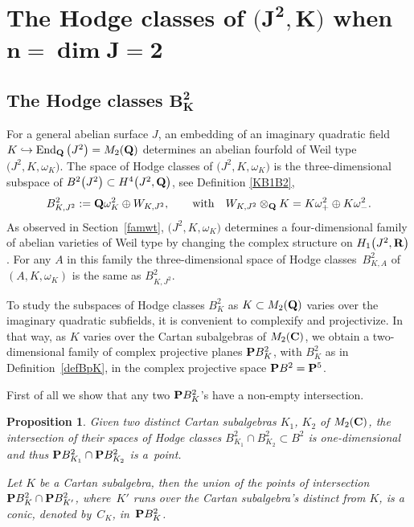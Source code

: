 \documentclass[10pt,a4paper]{amsart}
\numberwithin{equation}{section}
\newtheorem{Proposition}[Theorem]{Proposition}
 { \theoremstyle{definition}
\newtheorem{Definition}[Theorem]{Definition}
\newtheorem{Note}[Theorem]{Note}
\newtheorem{Example}[Theorem]{Example}
\newtheorem{Remark}[Theorem]{Remark} }
\begin{document}
\section[The Hodge classes of (J\^{}2,K) when n=dim J=2]{The Hodge classes of $\boldsymbol{\big(J^2,K\big)}$ when $\boldsymbol{n=\dim J=2}$}\label{limHC}

\subsection[The Hodge classes B\_K\^{}2]{The Hodge classes $\boldsymbol{B_K^2}$}\label{cubic4}

For a general abelian surface $J$,
an embedding of an imaginary quadratic field $K\hookrightarrow \operatorname{End}_{\bf Q}\big(J^2\big)=M_2({\bf Q})$
determines an abelian fourfold of Weil type $\big(J^2,K,\omega_K\big)$.
The space of Hodge classes of $\big(J^2,K,\omega_K\big)$ is the three-dimensional
subspace of $B^2\big(J^2\big)\subset H^4\big(J^2,{\bf Q}\big)$, see Definition \ref{KB1B2},
\[
B^2_{K,J^2} := {\bf Q} \omega_K^2 \oplus W_{K,J^2},\qquad \text{with}\quad
W_{K,J^2}\otimes_{\bf Q} K = K\omega_+^2 \oplus K\omega_-^2.
\]
As observed in Section~\ref{famwt},
$\big(J^2,K,\omega_K\big)$ determines
a four-dimensional family of abelian varieties of Weil type by changing the complex structure
on $H_1\big(J^2,{\bf R}\big)$.
For any $A$ in this family the three-dimensional space of Hodge classes~$B^2_{K,A}$
of $(A,K,\omega_K)$ is the same as $B^2_{K,J^2}$.

To study the subspaces of Hodge classes $B^2_K$ as $K\subset M_2({\bf Q})$
varies over the imaginary quadratic subfields,
it is convenient to complexify and projectivize. In that way,
as $K$ varies over the Cartan subalgebras of $M_2({\bf C})$,
we obtain a two-dimensional family of complex projective planes ${\bf P} B^2_K$,
with $B^2_K$ as in Definition~\ref{defBpK},
in the complex projective space ${\bf P} B^2={\bf P}^5$.

First of all we show that any two ${\bf P} B^2_K$'s have a non-empty intersection.

\begin{Proposition} \label{conicCK}
Given two distinct Cartan subalgebras $K_1$, $K_2$
of $M_2({\bf C})$, the intersection of their spaces of Hodge classes $B^2_{K_1}\cap B^2_{K_2}
\subset B^2$ is one-dimensional and thus ${\bf P} B^2_{K_1}\cap {\bf P} B^2_{K_2}$ is a~point.

Let $K$ be a Cartan subalgebra,
then the union of the points of intersection ${\bf P} B^2_K\cap {\bf P} B^2_{K'}$,
where~$K'$ runs over the Cartan subalgebra's distinct from $K$, is a conic, denoted by~$C_K$,
in~${\bf P} B^2_K$.
\end{Proposition}
\end{document}

